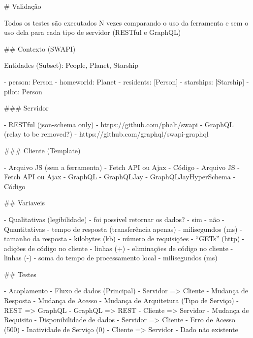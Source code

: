 # Validação

Todos os testes são executados N vezes comparando o uso da ferramenta e sem o uso dela para cada tipo de servidor (RESTful e GraphQL)

## Contexto (SWAPI)

Entidades (Subset): People, Planet, Starship

- person: Person
	- homeworld: Planet
		- residents: [Person]
	- starships: [Starship]
		- pilot: Person

### Servidor

- RESTful (json-schema only)
	- https://github.com/phalt/swapi
- GraphQL (relay to be removed?)
	- https://github.com/graphql/swapi-graphql

### Cliente (Template)

- Arquivo JS (sem a ferramenta)
	- Fetch API ou Ajax
	- Código
- Arquivo JS
	- Fetch API ou Ajax
	- GraphQL
	- GraphQLJay
	- GraphQLJayHyperSchema
	- Código

## Variaveis

- Qualitativas (legibilidade)
	- foi possível retornar os dados?
		- sim
		- não
- Quantitativas
	- tempo de resposta (transferência apenas)
		- milisegundos (ms)
	- tamanho da resposta
		- kilobytes (kb)
	- número de requisições
		- “GETs” (http)
	- adições de código no cliente
		- linhas (+)
	- eliminações de código no cliente
		- linhas (-)
	- soma do tempo de processamento local
		- milisegundos (ms)

## Testes

- Acoplamento
	- Fluxo de dados (Principal)
		- Servidor => Cliente
			- Mudança de Resposta
			- Mudança de Acesso
			- Mudança de Arquitetura (Tipo de Serviço)
				- REST => GraphQL
				- GraphQL => REST
		- Cliente => Servidor
			- Mudança de Requisito
	- Disponibilidade de dados
		- Servidor => Cliente
			- Erro de Acesso (500)
			- Inatividade de Serviço (0)
		- Cliente => Servidor
			- Dado não existente
